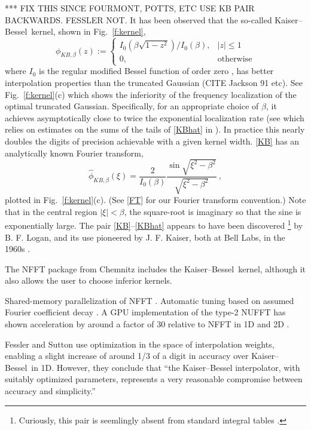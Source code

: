 \documentclass[10pt]{article}
\newcommand{\be}{\begin{equation}}
\newcommand{\ee}{\end{equation}}
\newcommand{\freq}{\beta}          %
\newcommand{\KB}{Kaiser--Bessel}
\begin{document}
*** FIX THIS SINCE FOURMONT, POTTS, ETC USE KB PAIR BACKWARDS. FESSLER NOT.
It has been observed that the so-called
\KB\ kernel, shown in Fig.~\ref{f:kernel},
\be
\phi_{KB,\freq}(z) := \left\{
\begin{array}{ll}I_0(\freq\sqrt{1-z^2}) / I_0(\freq), & |z|\le 1\\
  0,& \mbox{otherwise}\end{array}\right.
\label{KB}
\ee
where $I_0$ is the regular modified Bessel function of order zero
\cite[(10.25.2)]{dlmf}, has better interpolation
properties than the truncated Gaussian
(CITE Jackson 91 etc).
See Fig.~\ref{f:kernel}(c) which shows the inferiority of the
frequency localization of the optimal truncated Gaussian.
Specifically, for an appropriate choice of $\freq$, it achieves
asymptotically close to twice the exponential localization rate
(see \cite[p.19, (C.1) vs (C.4)]{nfft} which relies on
estimates on the sums of the tails of \eqref{KBhat}
in \cite{fourmontthesis,fourmont,pottshabil}).
In practice this nearly doubles the digits of precision achievable with
a given kernel width.
\eqref{KB} has an analytically known Fourier transform,
\be
\hat\phi_{KB,\freq}(\xi) = \frac{2}{I_0(\freq)}
\frac{\sin \sqrt{\xi^2-\freq^2}}{\sqrt{\xi^2-\freq^2}}
~,
\label{KBhat}
\ee
plotted in Fig.~\ref{f:kernel}(c).
(See \eqref{FT} for our Fourier transform convention.)
Note that in the central region $|\xi|<\freq$,
the square-root is imaginary so that the sine is exponentially large.
The pair \eqref{KB}--\eqref{KBhat}
appears to have been discovered%
\footnote{Curiously, this pair is
  seemlingly absent from standard integral tables \cite[\S 6.677]{GS8}
\cite[\S 2.5.25]{prudnikov1} \cite[\S 2.5.10]{prudnikov2}.}
by B. F. Logan, and its use pioneered by J. F. Kaiser, both at
Bell Labs, in the 1960s \cite{kaiser,kaiserinterview}.

The NFFT package \cite{nfft} from Chemnitz
includes the \KB\ kernel, although it also allows the user to
choose inferior kernels.

Shared-memory parallelization of NFFT \cite{volkmer}.
Automatic tuning based on assumed Fourier coefficient decay \cite{nestler}.
A GPU implementation of the type-2 NUFFT has shown acceleration by around
a factor of 30 relative to NFFT in 1D and 2D \cite{cunfft}.

Fessler and Sutton \cite{fessler} use optimization in the space of
interpolation weights, enabling a slight increase of around 1/3 of a
digit in accuracy over \KB\ in 1D. However, they conclude that
``the
Kaiser--Bessel interpolator, with suitably optimized parameters,
represents a very reasonable compromise between accuracy and
simplicity.''
\end{document}
